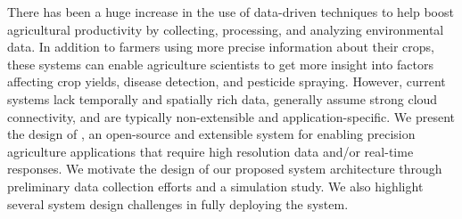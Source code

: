 There has been a huge increase in the use of data-driven techniques to help boost agricultural productivity by collecting, processing, and analyzing environmental data. In addition to farmers using more precise information about their crops, these systems can enable agriculture scientists to get more insight into factors affecting crop yields, disease detection, and pesticide spraying. However, current systems lack temporally and spatially rich data, generally assume strong cloud connectivity, and are typically non-extensible and application-specific. We present the design of \myname, an open-source and extensible system for enabling precision agriculture applications that require high resolution data and/or real-time responses. We motivate the design of our proposed system architecture through preliminary data collection efforts and a simulation study. We also highlight several system design challenges in fully deploying the system.


